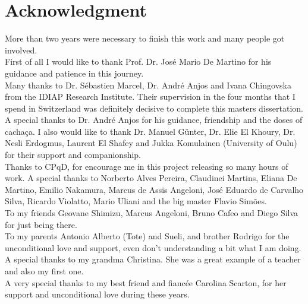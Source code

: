 \chapter*{Acknowledgment}


\noindent More than two years were necessary to finish this work and many people got involved. \\

First of all I would like to thank Prof. Dr. Jos\'e Mario De Martino for his guidance and patience in this journey. \\

Many thanks to Dr. S\'ebastien Marcel, Dr. Andr\'e Anjos and Ivana Chingovska from the IDIAP Research Institute. Their supervision in the four months that I spend in Switzerland was definitely decisive to complete this masters dissertation. A special thanks to Dr. Andr\'e Anjos for his guidance, friendship and the doses of cacha\c{c}a. I also would like to thank Dr. Manuel G{\"u}nter, Dr. Elie El Khoury, Dr. Nesli Erdogmus, Laurent El Shafey and Jukka Komulainen (University of Oulu) for their support and companionship. \\

Thanks to CPqD, for encourage me in this project releasing so many hours of work. A special thanks to Norberto Alves Pereira, Claudinei Martins, Eliana De Martino, Emilio Nakamura, Marcus de Assis Angeloni, Jos\'e Eduardo de Carvalho Silva, Ricardo Violatto, Mario Uliani and the big master Flavio Sim\~oes. \\

To my friends Geovane Shimizu, Marcus Angeloni, Bruno Cafeo and Diego Silva for just being there. \\

To my parents Antonio Alberto (Tote) and Sueli, and brother Rodrigo for the unconditional love and support, even don't understanding a bit what I am doing. A special thanks to my grandma Christina. She was a great example of a teacher and also my first one. \\

A very special thanks to my best friend and fianc\'ee Carolina Scarton, for her support and unconditional love during these years.


\newpage %

\null


